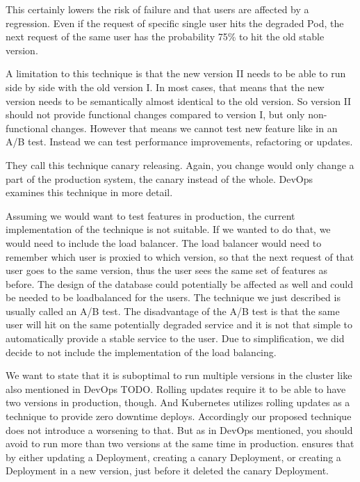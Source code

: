 This certainly lowers the risk of failure and that users are affected by a
regression. Even if the request of specific single user hits the degraded Pod, the next
request of the same user has the probability 75\% to hit the old stable version.

A limitation to this technique is that the new version II needs to be able to run side by
side with the old version I. In most cases, that means that the new version needs to be
semantically almost identical to the old version. So version II should not provide
functional changes compared to version I, but only non-functional changes. However that
means we cannot test new feature like in an A/B test. Instead we can test performance
improvements, refactoring or updates.

They call this technique canary releasing. Again, you change would only change a part of
the production system, the canary instead of the whole. DevOps~\cite{cd_humble_deploy}
examines this technique in more detail.

Assuming we would want to test features in production, the current implementation of the
technique is not suitable. If we wanted to do that, we would need to include the
load balancer. The load balancer would need to remember which user is proxied to which
version, so that the next request of that user goes to the same version, thus the user
sees the same set of features as before. The design of the database could potentially be
affected as well and could be needed to be loadbalanced for the users. The technique we
just described is usually called an A/B test. The disadvantage of the A/B test is that the
same user will hit on the same potentially degraded service and it is not that simple to
automatically provide a stable service to the user. Due to simplification, we did decide
to not include the implementation of the load balancing.

We want to state that it is suboptimal to run multiple versions in the cluster like also
mentioned in DevOps TODO. Rolling updates require it to be able to have two versions in
production, though. And Kubernetes utilizes rolling updates as a technique to provide zero
downtime deploys. Accordingly our proposed technique does not introduce a worsening to
that. But as in DevOps mentioned, you should avoid to run more than two versions at the
same time in production. \deployer ensures that by either updating a Deployment, creating a
canary Deployment, or creating a Deployment in a new version, just before it deleted the
canary Deployment.

